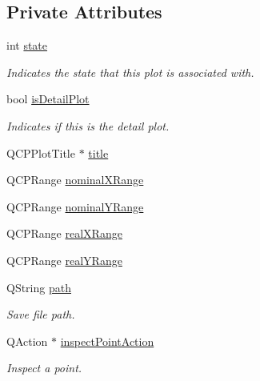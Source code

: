 \subsection*{Private Attributes}
\begin{DoxyCompactItemize}
\item 
\mbox{\label{classSGCustomPlot_ac17b8dfc3d9579e6286efa060ca55ab0}} 
int \hyperlink{classSGCustomPlot_ac17b8dfc3d9579e6286efa060ca55ab0}{state}
\begin{DoxyCompactList}\small\item\em Indicates the state that this plot is associated with. \end{DoxyCompactList}\item 
\mbox{\label{classSGCustomPlot_a216325e80035b2042215a6ad9cd82202}} 
bool \hyperlink{classSGCustomPlot_a216325e80035b2042215a6ad9cd82202}{is\+Detail\+Plot}
\begin{DoxyCompactList}\small\item\em Indicates if this is the detail plot. \end{DoxyCompactList}\item 
Q\+C\+P\+Plot\+Title $\ast$ \hyperlink{classSGCustomPlot_a230237a7692e75bfe15e250342bfd801}{title}
\item 
Q\+C\+P\+Range \hyperlink{classSGCustomPlot_a255402d40b328430c649c878ee593b11}{nominal\+X\+Range}
\item 
Q\+C\+P\+Range \hyperlink{classSGCustomPlot_a4d7a4961ec0e095a9c3582060bc9cbd2}{nominal\+Y\+Range}
\item 
Q\+C\+P\+Range \hyperlink{classSGCustomPlot_a96f63b86fe49372586cb6be908d88bc4}{real\+X\+Range}
\item 
Q\+C\+P\+Range \hyperlink{classSGCustomPlot_aeffca93d0d63a439e3c3bf35d18fa698}{real\+Y\+Range}
\item 
Q\+String \hyperlink{classSGCustomPlot_a9051f043c91f3e59fbc1c2a818c76687}{path}
\begin{DoxyCompactList}\small\item\em Save file path. \end{DoxyCompactList}\item 
\mbox{\label{classSGCustomPlot_a73fd511ad74d3db5433f51f8a75a5f92}} 
Q\+Action $\ast$ \hyperlink{classSGCustomPlot_a73fd511ad74d3db5433f51f8a75a5f92}{inspect\+Point\+Action}
\begin{DoxyCompactList}\small\item\em Inspect a point. \end{DoxyCompactList}\item 

\end{DoxyCompactItemize}

